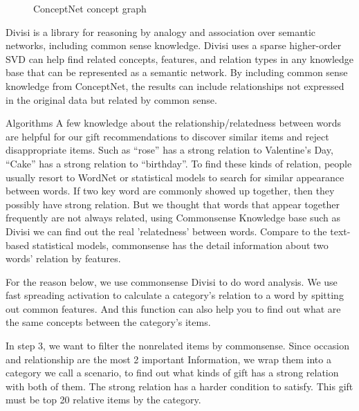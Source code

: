 \documentclass[11pt,twocolumn]{article}
\begin{document}
\begin{figure}[h!t]
\caption{ConceptNet concept graph}
\label{graph}
\end{figure}


{\large Divisi}
is a library for reasoning by analogy and association over semantic networks, including common sense knowledge.
Divisi uses a sparse higher-order SVD can help find related concepts, features, and relation types in any knowledge base that can be represented as a semantic network. By including common sense knowledge from ConceptNet, the results can include relationships not expressed in the original data but related by common sense.

{\large Algorithms}
A few knowledge about the relationship/relatedness between words are helpful for our gift recommendations to discover similar items and reject disappropriate items. Such as ``rose'' has a strong relation to Valentine’s Day, ``Cake'' has a strong relation to ``birthday''. To find these kinds of relation, people usually resort to WordNet or statistical models to search for similar appearance between words. If two key word are commonly showed up together, then they possibly have strong relation.  But we thought that words that appear together frequently are not always related, using Commonsense Knowledge base such as Divisi we can find out the real 'relatedness' between words. Compare to the text-based statistical models, commonsense has the detail information about two words’ relation by features.

For the reason below, we use commonsense Divisi to do word analysis. We use fast spreading activation to calculate a category’s relation to a word by spitting out common features.   And this function can also help you to find out what are the same concepts between the category’s items.

In step 3, we want to filter the nonrelated items by commonsense.   Since occasion and relationship are the most 2 important Information, we wrap them into a category we call a scenario, to find out what kinds of gift has a strong relation with both of them.   The strong relation has a harder condition to satisfy.  This gift must be top 20 relative items by the category. 
\end{document}
